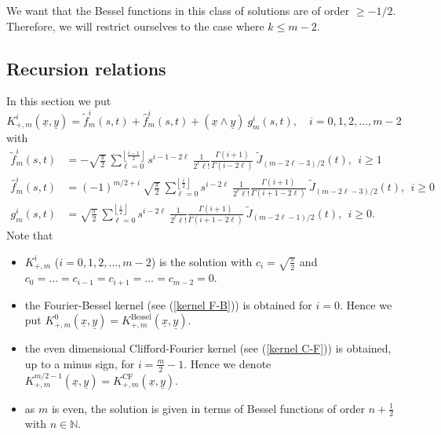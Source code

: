 \documentclass{amsart}
\theoremstyle{remark}
\begin{document}
We want that the Bessel functions in this class of solutions are of order $\geq -1/2$. Therefore, we will restrict ourselves to the case where $k \leq m-2$.

\subsection{Recursion relations}

In this section we put
\begin{equation}\label{kernel even m}
K^{i}_{+ , m}({\underline{x}},{\underline{y}})  =  \tilde{f}_m^i(s,t) +  \hat{f}_m^i(s,t) + ({\underline{x}} \wedge {\underline{y}}) \ g_m^i(s,t), \quad i=0,1,2, \ldots , m-2
\end{equation}
with
\begin{align*}
\tilde{f}_m^i(s,t) &=  -  \sqrt{\frac{\pi}{2}} \ \sum_{\ell =0}^{\left\lfloor  \frac{i-1}{2} \right\rfloor} s^{i-1-2 \ell} \ \frac{1}{2^{\ell} \ell!} \frac{\Gamma(i+1)}{\Gamma(i-2\ell)} \ \widetilde{J}_{(m-2\ell-3)/2}(t), \ \ i \geq 1\\
\hat{f}_m^i (s,t) &=  (-1)^{m/2+i} \   \sqrt{\frac{\pi}{2}} \ \sum_{\ell =0}^{\left\lfloor  \frac{i}{2} \right\rfloor} s^{i-2 \ell} \ \frac{1}{2^{\ell} \ell!} \frac{\Gamma(i+1)}{\Gamma(i+1-2\ell)} \ \widetilde{J}_{(m-2\ell-3)/2}(t) , \ \ i \geq 0\\
g_m^i(s,t) &=   \sqrt{\frac{\pi}{2}} \ \sum_{\ell =0}^{\left\lfloor  \frac{i}{2} \right\rfloor} s^{i-2 \ell} \ \frac{1}{2^{\ell} \ell!} \frac{\Gamma(i+1)}{\Gamma(i+1-2\ell)} \ \widetilde{J}_{(m-2\ell-1)/2}(t) , \ \  i \geq 0.
\end{align*}
Note that
\begin{itemize}
\item $K^{i}_{+ , m}$ ($i=0,1,2, \ldots , m-2$) is the solution with $c_i = \sqrt{\frac{\pi}{2}}$ and $c_0= \ldots = c_{i-1} = c_{i+1} = \ldots = c_{m-2} = 0$.
\item the Fourier-Bessel kernel (see (\ref{kernel F-B})) is obtained for $i=0$. Hence we put $K_{+,m}^{0}({\underline{x}},{\underline{y}}) = K_{+,m}^{\mathrm{Bessel}} ({\underline{x}},{\underline{y}})$. 
\item the even dimensional Clifford-Fourier kernel (see (\ref{kernel C-F})) is obtained, up to a minus sign, for $i = \frac{m}{2}-1$. Hence we denote $K_{+,m}^{m/2-1}({\underline{x}},{\underline{y}}) = K_{+,m}^{\mathrm{CF}} ({\underline{x}},{\underline{y}})$.
\item as $m$ is even, the solution is given in terms of Bessel functions of order $n+\frac{1}{2}$ with $n \in \mathbb{N}$.
\end{itemize}
\end{document}
